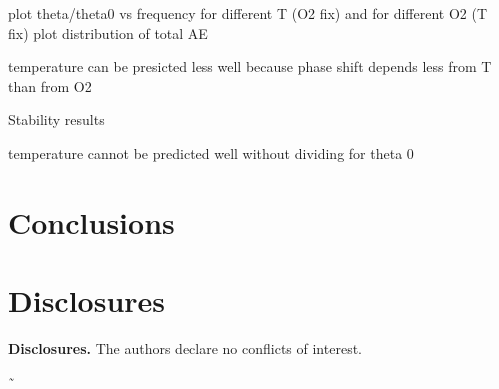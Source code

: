 \documentclass[9pt,twocolumn,twoside,pdftex]{optica}
\begin{document}
plot theta/theta0 vs frequency for different T (O2 fix) and for different O2 (T fix)
plot distribution of total AE

temperature can be presicted less well because phase shift depends less from T than from O2

Stability results

temperature cannot be predicted well without dividing for theta 0




\section{Conclusions}






\section*{Disclosures}

\medskip

\noindent\textbf{Disclosures.} The authors declare no conflicts of interest.









˜
\end{document}
